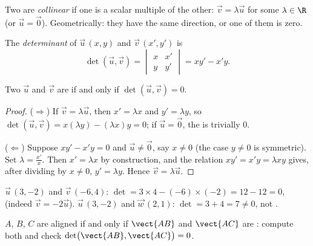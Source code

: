 \begin{definition}\label{def:g11:vect:collinear}
Two  are \emph{collinear} if one is a
scalar multiple of the other: $\vec v = \lambda \vec u$ for some
$\lambda \in \R$ (or $\vec u = \vec 0$). Geometrically: they have the same
direction, or one of them is zero.
\end{definition}

\begin{definition}[Determinant]\label{def:g11:vect:det}
The \emph{determinant} of $\vec u\,(x, y)$ and
$\vec v\,(x', y')$ is
\[
\det(\vec u, \vec v) =
\begin{vmatrix} x & x' \\ y & y' \end{vmatrix}
= x y' - x' y .
\]
\end{definition}

\begin{theorem}\label{thm:g11:vect:collinearity}
Two  $\vec u$ and $\vec v$ are  if and only if
$\det(\vec u, \vec v) = 0$.
\end{theorem}

\begin{proof}
($\Rightarrow$) If $\vec v = \lambda\vec u$, then $x' = \lambda x$ and
$y' = \lambda y$, so
$\det(\vec u, \vec v) = x(\lambda y) - (\lambda x)y = 0$; if
$\vec u = \vec 0$, the  is trivially $0$.

($\Leftarrow$) Suppose $xy' - x'y = 0$ and $\vec u \neq \vec 0$, say
$x \neq 0$ (the case $y \neq 0$ is symmetric). Set
$\lambda = \frac{x'}{x}$. Then $x' = \lambda x$ by construction, and the
relation $xy' = x'y = \lambda x y$ gives, after dividing by $x \neq 0$,
$y' = \lambda y$. Hence $\vec v = \lambda \vec u$.
\end{proof}

\begin{example}\label{ex:g11:vect:collinear}
$\vec u\,(3, -2)$ and $\vec v\,(-6, 4)$:
$\det = 3 \times 4 - (-6) \times (-2) = 12 - 12 = 0$,  (indeed
$\vec v = -2\vec u$). $\vec u\,(3, -2)$ and $\vec w\,(2, 1)$:
$\det = 3 + 4 = 7 \neq 0$, not .
\end{example}

\begin{method}\label{met:g11:vect:alignment}
$A$, $B$, $C$ are aligned if and only if $\vect{AB}$ and $\vect{AC}$ are
: compute both  and check
$\det\bigl(\vect{AB}, \vect{AC}\bigr) = 0$.
\end{method}


